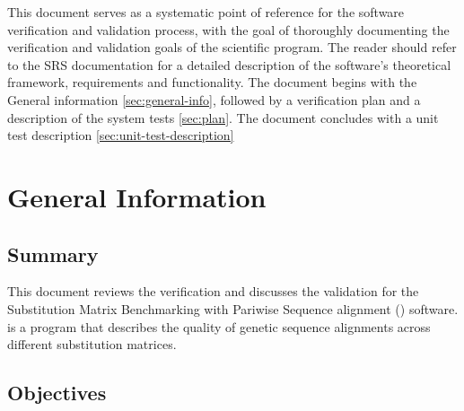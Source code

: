 \documentclass[12pt, titlepage]{article}
\begin{document}



\newpage

This document serves as a systematic point of reference for the \progname{} software verification and validation process,
with the goal of thoroughly documenting the verification and validation goals of the scientific program.
The reader should refer to the SRS documentation for a detailed description of the software's theoretical framework, requirements
 and functionality. The document begins with the General information \autoref{sec:general-info}, followed by a verification plan and 
 a description of the system tests \autoref{sec:plan}. The document concludes with a unit test description \autoref{sec:unit-test-description}

\section{General Information}\label{sec:general-info}

\subsection{Summary}

This document reviews the verification and discusses the validation for the Substitution Matrix 
Benchmarking with Pariwise Sequence alignment (\progname{}) software. \progname{} is a program 
that describes the quality of genetic sequence alignments across different substitution matrices.


\subsection{Objectives}
\end{document}
